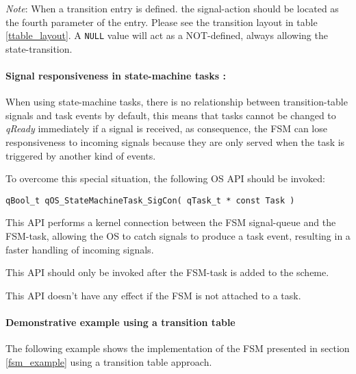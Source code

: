 \begin{tcolorbox}
\ArrowBoldDownRight \textit{Note}: When a transition entry is defined. the signal-action should be located as the fourth parameter of the entry. Please see the transition layout in table \ref{ttable_layout}.
A \lstinline{NULL} value will act as a NOT-defined, always allowing the state-transition. 
\end{tcolorbox}

\paragraph{Signal responsiveness in state-machine tasks :}

When using state-machine tasks, there is no relationship between transition-table signals and task events by default, this means that tasks cannot be changed to \textit{qReady} immediately if a signal is received, as consequence, the FSM can lose responsiveness to incoming signals because they are only served when the task is triggered by another kind of events. 

To overcome this special situation, the following OS API should be invoked:
\medskip

\begin{lstlisting}[style=CStyle]
qBool_t qOS_StateMachineTask_SigCon( qTask_t * const Task )
\end{lstlisting} 

This API performs a kernel connection between the FSM signal-queue and the FSM-task, allowing the OS to catch signals to produce a task event, resulting in a faster handling of incoming signals.
\medskip

\begin{tcolorbox}
\HandRight This API should only be invoked after the FSM-task is added to the scheme.
\end{tcolorbox}

\begin{tcolorbox}
\HandRight This API doesn't have any effect if the FSM is not attached to a task.
\end{tcolorbox}

\paragraph{Demonstrative example using a transition table}
The following example shows the implementation of the FSM presented in section \ref{fsm_example} using a transition table approach.

